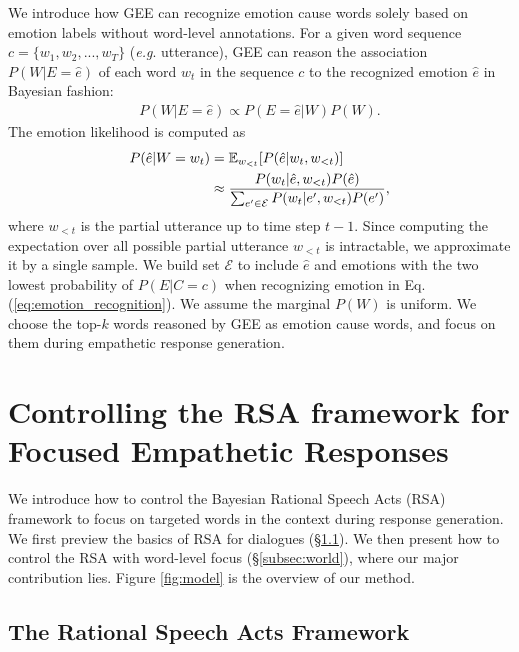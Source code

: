 \documentclass[11pt]{article}
\makeatletter
\DeclareRobustCommand\onedot{\futurelet\@let@token\@onedot}
\def\onedot{. }
\def\eg{\emph{e.g}\onedot} \def\Eg{\emph{E.g}\onedot}
\makeatother
\begin{document}
We introduce how GEE can recognize emotion cause words solely based on emotion labels without word-level annotations.
For a given word sequence $c=\{w_1, w_2, ..., w_T\}$ (\eg utterance),
GEE can reason the association $P(W|E=\hat{e})$ of each word $w_t$ in the sequence $c$ to the recognized emotion $\hat{e}$ in Bayesian fashion:
\begin{align}
    P(W|E=\hat{e}) \propto P(E=\hat{e}|W)P(W).
    \label{eq:emotionalword_recognition}
\end{align}
The emotion likelihood is computed as 
\begin{align}
    P(\hat{e}|W=w_t) &= \mathbb{E}_{w_{<t}}[P(\hat{e}|w_t, w_{<t})] \\
                     & \approx \frac{P(w_t|\hat{e}, w_{<t})P(\hat{e})}{\sum_{e' \in \mathcal{E}} P(w_t|e', w_{<t})P(e')}, \notag
\end{align}
where $w_{<t}$ is the partial utterance up to time step $t-1$.
Since computing the expectation over all possible partial utterance $w_{<t}$ is intractable, we approximate it by a single sample.
We build set $\mathcal{E}$ to include $\hat{e}$ and emotions with the two lowest probability of $P(E|C=c)$  when recognizing emotion in Eq.(\ref{eq:emotion_recognition}). 
We assume the marginal $P(W)$ is uniform.
We choose the top-$k$ words reasoned by GEE as emotion cause words, and focus on them during empathetic response generation.










\section{Controlling the RSA framework for Focused Empathetic Responses}
\label{sec:generation}

We introduce how to control the Bayesian Rational Speech Acts (RSA) framework \citep{Frank:2012:Science} to focus on targeted words in the context during response generation.
We first preview the basics of RSA for dialogues (\S \ref{subsec:rsa}).
We then present how to control the RSA with word-level focus (\S \ref{subsec:world}), where our major contribution lies.
Figure \ref{fig:model} is the overview of our method.


\subsection{The Rational Speech Acts Framework}
\label{subsec:rsa}
\end{document}
